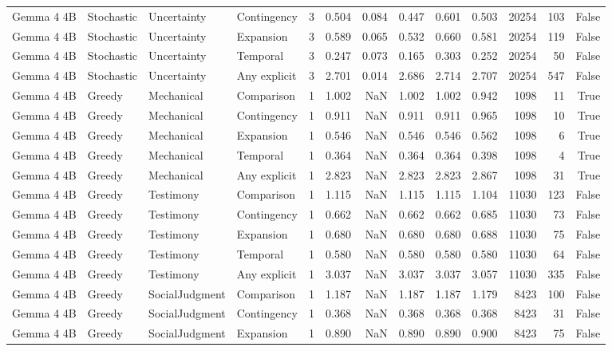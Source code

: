 \begin{tabular}{llllrrrrrrrrr}
Gemma 4 4B & Stochastic & Uncertainty & Contingency & 3 & 0.504 & 0.084 & 0.447 & 0.601 & 0.503 & 20254 & 103 & False \\
Gemma 4 4B & Stochastic & Uncertainty & Expansion & 3 & 0.589 & 0.065 & 0.532 & 0.660 & 0.581 & 20254 & 119 & False \\
Gemma 4 4B & Stochastic & Uncertainty & Temporal & 3 & 0.247 & 0.073 & 0.165 & 0.303 & 0.252 & 20254 & 50 & False \\
Gemma 4 4B & Stochastic & Uncertainty & Any explicit & 3 & 2.701 & 0.014 & 2.686 & 2.714 & 2.707 & 20254 & 547 & False \\
Gemma 4 4B & Greedy & Mechanical & Comparison & 1 & 1.002 & NaN & 1.002 & 1.002 & 0.942 & 1098 & 11 & True \\
Gemma 4 4B & Greedy & Mechanical & Contingency & 1 & 0.911 & NaN & 0.911 & 0.911 & 0.965 & 1098 & 10 & True \\
Gemma 4 4B & Greedy & Mechanical & Expansion & 1 & 0.546 & NaN & 0.546 & 0.546 & 0.562 & 1098 & 6 & True \\
Gemma 4 4B & Greedy & Mechanical & Temporal & 1 & 0.364 & NaN & 0.364 & 0.364 & 0.398 & 1098 & 4 & True \\
Gemma 4 4B & Greedy & Mechanical & Any explicit & 1 & 2.823 & NaN & 2.823 & 2.823 & 2.867 & 1098 & 31 & True \\
Gemma 4 4B & Greedy & Testimony & Comparison & 1 & 1.115 & NaN & 1.115 & 1.115 & 1.104 & 11030 & 123 & False \\
Gemma 4 4B & Greedy & Testimony & Contingency & 1 & 0.662 & NaN & 0.662 & 0.662 & 0.685 & 11030 & 73 & False \\
Gemma 4 4B & Greedy & Testimony & Expansion & 1 & 0.680 & NaN & 0.680 & 0.680 & 0.688 & 11030 & 75 & False \\
Gemma 4 4B & Greedy & Testimony & Temporal & 1 & 0.580 & NaN & 0.580 & 0.580 & 0.580 & 11030 & 64 & False \\
Gemma 4 4B & Greedy & Testimony & Any explicit & 1 & 3.037 & NaN & 3.037 & 3.037 & 3.057 & 11030 & 335 & False \\
Gemma 4 4B & Greedy & SocialJudgment & Comparison & 1 & 1.187 & NaN & 1.187 & 1.187 & 1.179 & 8423 & 100 & False \\
Gemma 4 4B & Greedy & SocialJudgment & Contingency & 1 & 0.368 & NaN & 0.368 & 0.368 & 0.368 & 8423 & 31 & False \\
Gemma 4 4B & Greedy & SocialJudgment & Expansion & 1 & 0.890 & NaN & 0.890 & 0.890 & 0.900 & 8423 & 75 & False \\

\end{tabular}
